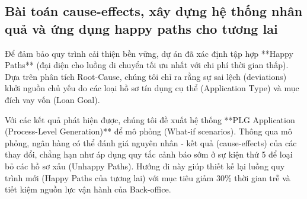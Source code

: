 \documentclass[a4paper,12pt]{article}
\begin{document}
\subsection{Bài toán cause-effects, xây dựng hệ thống nhân quả và ứng dụng happy paths cho tương lai}
Để đảm bảo quy trình cải thiện bền vững, dự án đã xác định tập hợp **Happy Paths** (đại diện cho luồng di chuyển tối ưu nhất với chi phí thời gian thấp). Dựa trên phân tích Root-Cause, chúng tôi chỉ ra rằng sự sai lệch (deviations) khởi nguồn chủ yếu do các loại hồ sơ tín dụng cụ thể (Application Type) và mục đích vay vốn (Loan Goal). 

Với các kết quả phát hiện được, chúng tôi đề xuất hệ thống **PLG Application (Process-Level Generation)** để mô phỏng (What-if scenarios). Thông qua mô phỏng, ngân hàng có thể đánh giá nguyên nhân - kết quả (cause-effects) của các thay đổi, chẳng hạn như áp dụng quy tắc cảnh báo sớm ở sự kiện thứ 5 để loại bỏ các hồ sơ xấu (Unhappy Paths). Hướng đi này giúp thiết kế lại luồng quy trình mới (Happy Paths của tương lai) với mục tiêu giảm 30\% thời gian trễ và tiết kiệm nguồn lực vận hành của Back-office.
\end{document}
